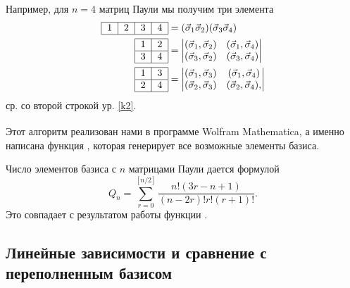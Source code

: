 \documentclass[]{article}
\renewcommand{\[}{\begin{equation}}
\renewcommand{\]}{\end{equation}}
\begin{document}
Например, для $n=4$ матриц Паули мы получим три элемента
\begin{align}
\begin{tabular}{ |l|l|l|l| }
\hline
1 & 2 & 3 & 4 \\
\hline
\end{tabular} & = ({\vec \sigma}_1{\vec\sigma}_2)({\vec \sigma}_3{\vec\sigma}_4) \nonumber
\\
%	
\begin{tabular}{ |l|l| }
\hline
1 & 2 \\ \hline
3 & 4 \\
\hline
\end{tabular} &
=\begin{vmatrix}
(\vec\sigma_1,\vec\sigma_2) & (\vec\sigma_1,\vec\sigma_4)\\
(\vec\sigma_3,\vec\sigma_2) & (\vec\sigma_3,\vec\sigma_4)\\
\end{vmatrix} \nonumber
\\
%
\begin{tabular}{ |l|l| }
\hline
1 & 3 \\ \hline
2 & 4 \\
\hline
\end{tabular} &
=\begin{vmatrix}
(\vec\sigma_1,\vec\sigma_3) & (\vec\sigma_1,\vec\sigma_4)\\
(\vec\sigma_2,\vec\sigma_3) & (\vec\sigma_2,\vec\sigma_4),\\
\end{vmatrix}
\nonumber
\end{align}
ср. со второй строкой ур. \eqref{k2}.


Этот алгоритм реализован нами в программе Wolfram Mathematica\textsuperscript{\textcopyright}, а именно  написана функция  \cite{basis_gen_code}, которая генерирует все возможные элементы базиса.

Число элементов базиса с $n$ матрицами Паули дается формулой \cite{sourceArticle}
$$
Q_n = \sum_{r=0}^{[n/2]}\frac{n!(3r-n+1)}{(n-2r)!r!(r+1)!}.
$$
Это совпадает с результатом работы функции \cite{basis_gen_code}.


\subsection{Линейные зависимости и сравнение с переполненным базисом}
\end{document}
